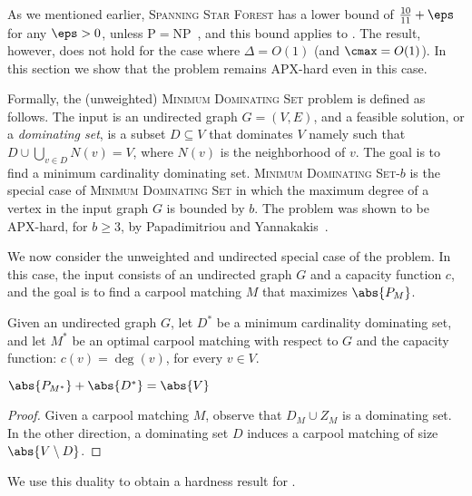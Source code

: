 
As we mentioned earlier, \textsc{Spanning Star Forest} has a lower
bound of $\frac{10}{11} + \eps$ for any $\eps > 0$, unless
P$=$NP~\cite{ChakrabartyGoel10}, and this bound applies to \carpool.
%
The result, however, does not hold for the case where $\Delta = O(1)$
(and $\cmax = O(1)$).  In this section we show that the problem remains
APX-hard even in this case.

Formally, the (unweighted) \textsc{Minimum Dominating Set} problem is
defined as follows.  The input is an undirected graph $G = (V,E)$, and
a feasible solution, or a \emph{dominating set}, is a subset
$D \subseteq V$ that dominates $V$ namely such that
$D \cup \bigcup_{v \in D} N(v) = V$, where $N(v)$ is the neighborhood
of $v$.  The goal is to find a minimum cardinality dominating set.
%
\textsc{Minimum Dominating Set-$b$} is the special case of
\textsc{Minimum Dominating Set} in which
the maximum degree of a vertex in the input graph $G$ is bounded by
$b$.  The problem was shown to be APX-hard, for $b \geq 3$, by
Papadimitriou and Yannakakis~\cite{PapYan88}.

We now consider the unweighted and undirected special case of
the \carpool problem.  In this case, the input consists of an
undirected graph $G$ and a capacity function $c$, and the goal is to
find a carpool matching $M$ that maximizes $\abs{P_M}$.

Given an undirected graph $G$, let $D^*$ be a minimum cardinality
dominating set, and let $M^*$ be an optimal carpool matching with
respect to $G$ and the capacity function: $c(v) = \deg(v)$, for every
$v \in V$.

\begin{observation}
$\abs{P_{M^*}} + \abs{D^*} = \abs{V}$ 
\end{observation}
\begin{proof}
Given a carpool matching $M$, observe that $D_M \cup Z_M$ is a
dominating set.  In the other direction, a dominating set $D$ induces
a carpool matching of size $\abs{V \setminus D}$.
\end{proof}

We use this duality to obtain a hardness result for \carpool.

